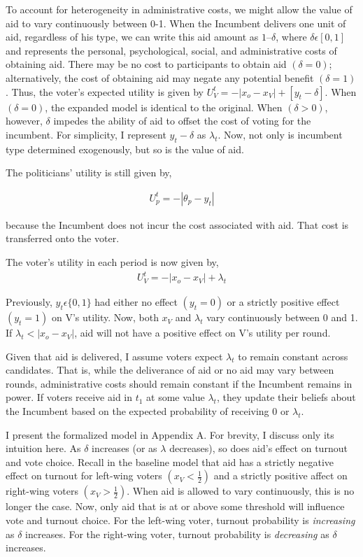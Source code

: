\documentclass[12pt]{paper}
\begin{document}
To account for heterogeneity in administrative costs, we might allow the value of aid to vary continuously between 0-1. When the Incumbent delivers one unit of aid, regardless of his type, we can write this aid amount as $1 – \delta$, where $\delta \epsilon [0,1]$ and represents the personal, psychological, social, and administrative costs of obtaining aid. There may be no cost to participants to obtain aid $(\delta = 0)$; alternatively, the cost of obtaining aid may negate any potential benefit $(\delta = 1)$. Thus, the voter’s expected utility is given by $U_{V}^t = -|x_o - x_V| + [y_t - \delta]$. When $(\delta = 0)$, the expanded model is identical to the original. When $(\delta > 0)$, however, $\delta$ impedes the ability of aid to offset the cost of voting for the incumbent. For simplicity, I represent $y_t - \delta$ as  $\lambda_t$. Now, not only is incumbent type determined exogenously, but so is the value of aid.


The politicians’ utility is still given by,

\begin{gather}
U_{p}^t = -|\theta_p - y_t|
\end{gather}

because the Incumbent does not incur the cost associated with aid. That cost is transferred onto the voter.

The voter’s utility in each period is now given by, 
\begin{gather}
U_{V}^t = -|x_o - x_V| + \lambda_t
\end{gather}

Previously, $y_t \epsilon \{0,1\}$ had either no effect $(y_t = 0)$ or a strictly positive effect $(y_t = 1)$ on V's utility. Now, both $x_V$ and $\lambda_t$ vary continuously between 0 and 1. If $\lambda_t < |x_o - x_V|$, aid will not have a positive effect on V’s utility per round. 

Given that aid is delivered, I assume voters expect $\lambda_t$ to remain constant across candidates. That is, while the deliverance of aid or no aid may vary between rounds, administrative costs should remain constant if the Incumbent remains in power. If voters receive aid in $t_1$ at some value $\lambda_t$, they update their beliefs about the Incumbent based on the expected probability of receiving 0 or $\lambda_t$.

I present the formalized model in Appendix A. For brevity, I discuss only its intuition here. As $\delta$ increases (or as $\lambda$ decreases), so does aid's effect on turnout and vote choice. Recall in the baseline model that aid has a strictly negative effect on turnout for left-wing voters $(x_V < \frac{1}{2})$ and a strictly positive affect on right-wing voters $(x_V > \frac{1}{2})$. When aid is allowed to vary continuously, this is no longer the case. Now, only aid that is at or above some threshold will influence vote and turnout choice. For the left-wing voter, turnout probability is \textit{increasing} as $\delta$ increases. For the right-wing voter, turnout probability is \textit{decreasing} as $\delta$ increases.
\end{document}
